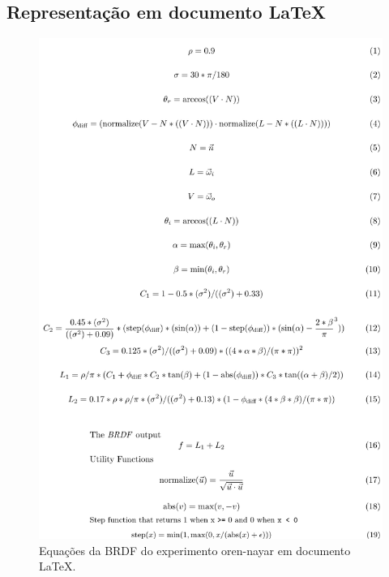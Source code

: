 \subsection{Representação em documento \LaTeX{}}
\begin{figure}[H]
    \caption{\label{fig-oren-nayar-eqlang-latex} \small Equações da BRDF do experimento oren-nayar em documento \LaTeX{}.}
    \begin{center}
        \includegraphics[scale=0.82]{./Imagens/brdfs/oren-nayar.pdf}
    \end{center}
\end{figure}

